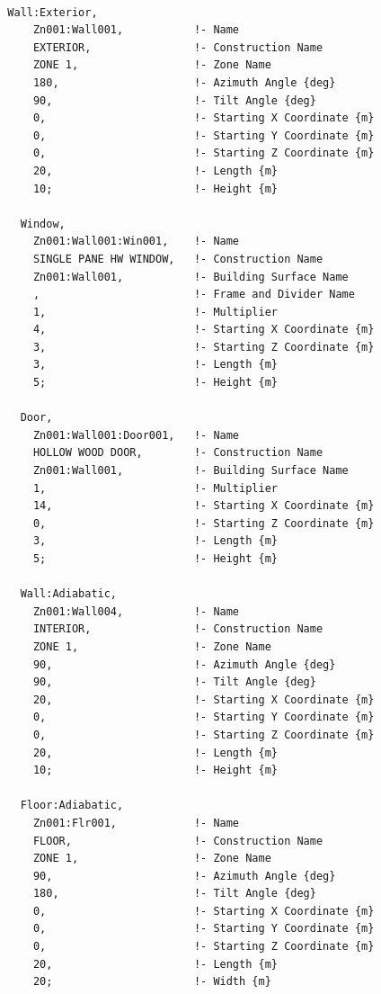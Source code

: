 \begin{lstlisting}

  Wall:Exterior,
      Zn001:Wall001,           !- Name
      EXTERIOR,                !- Construction Name
      ZONE 1,                  !- Zone Name
      180,                     !- Azimuth Angle {deg}
      90,                      !- Tilt Angle {deg}
      0,                       !- Starting X Coordinate {m}
      0,                       !- Starting Y Coordinate {m}
      0,                       !- Starting Z Coordinate {m}
      20,                      !- Length {m}
      10;                      !- Height {m}

    Window,
      Zn001:Wall001:Win001,    !- Name
      SINGLE PANE HW WINDOW,   !- Construction Name
      Zn001:Wall001,           !- Building Surface Name
      ,                        !- Frame and Divider Name
      1,                       !- Multiplier
      4,                       !- Starting X Coordinate {m}
      3,                       !- Starting Z Coordinate {m}
      3,                       !- Length {m}
      5;                       !- Height {m}

    Door,
      Zn001:Wall001:Door001,   !- Name
      HOLLOW WOOD DOOR,        !- Construction Name
      Zn001:Wall001,           !- Building Surface Name
      1,                       !- Multiplier
      14,                      !- Starting X Coordinate {m}
      0,                       !- Starting Z Coordinate {m}
      3,                       !- Length {m}
      5;                       !- Height {m}

    Wall:Adiabatic,
      Zn001:Wall004,           !- Name
      INTERIOR,                !- Construction Name
      ZONE 1,                  !- Zone Name
      90,                      !- Azimuth Angle {deg}
      90,                      !- Tilt Angle {deg}
      20,                      !- Starting X Coordinate {m}
      0,                       !- Starting Y Coordinate {m}
      0,                       !- Starting Z Coordinate {m}
      20,                      !- Length {m}
      10;                      !- Height {m}

    Floor:Adiabatic,
      Zn001:Flr001,            !- Name
      FLOOR,                   !- Construction Name
      ZONE 1,                  !- Zone Name
      90,                      !- Azimuth Angle {deg}
      180,                     !- Tilt Angle {deg}
      0,                       !- Starting X Coordinate {m}
      0,                       !- Starting Y Coordinate {m}
      0,                       !- Starting Z Coordinate {m}
      20,                      !- Length {m}
      20;                      !- Width {m}


\end{lstlisting}
